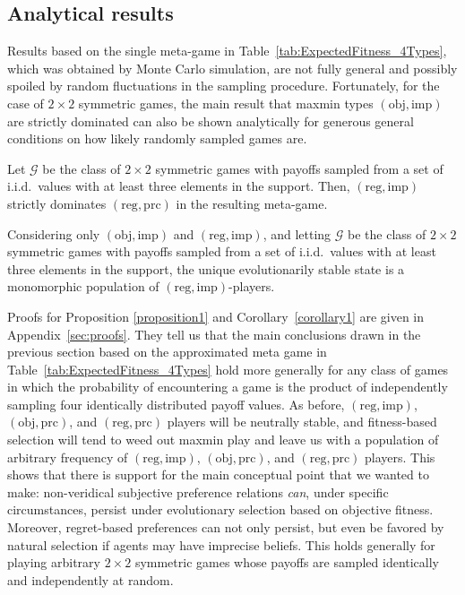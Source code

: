 \documentclass[fleqn,reqno,11pt]{article}
\begin{document}
\subsection{Analytical results}
\label{sec:analytical-results}

Results based on the single meta-game in Table~\ref{tab:ExpectedFitness_4Types}, which was
obtained by Monte Carlo simulation, are not fully general and possibly spoiled by random
fluctuations in the sampling procedure. Fortunately, for the case of $2 \times 2$ symmetric
games, the main result that maxmin types $(\text{obj}, \text{imp})$ are strictly dominated can
also be shown analytically for generous general conditions on how likely randomly sampled games
are. 

\begin{proposition} \label{proposition1}
  Let $\mathcal{G}$ be the class of $2 \times 2$ symmetric games with payoffs sampled from a
  set of i.i.d.~values with at least three elements in the support. Then,
  $(\text{reg}, \text{imp})$ strictly dominates $(\text{reg}, \text{prc})$ in the resulting
  meta-game.
\end{proposition}

\begin{corollary} \label{corollary1} Considering only $(\text{obj}, \text{imp})$ and
  $(\text{reg}, \text{imp})$, and letting $\mathcal{G}$ be the class of $2 \times 2$ symmetric
  games with payoffs sampled from a set of i.i.d.~values with at least three elements in the
  support, the unique evolutionarily stable state is a monomorphic population of
  $(\text{reg}, \text{imp})$-players.
\end{corollary}

Proofs for Proposition \ref{proposition1} and Corollary~\ref{corollary1} are given in
Appendix~\ref{sec:proofs}. They tell us that the main conclusions drawn in the previous section
based on the approximated meta game in Table~\ref{tab:ExpectedFitness_4Types} hold more
generally for any class of games in which the probability of encountering a game is the product
of independently sampling four identically distributed payoff values. As before,
$(\text{reg}, \text{imp})$, $(\text{obj}, \text{prc})$, and $(\text{reg}, \text{prc})$ players
will be neutrally stable, and fitness-based selection will tend to weed out maxmin play and
leave us with a population of arbitrary frequency of $(\text{reg}, \text{imp})$,
$(\text{obj}, \text{prc})$, and $(\text{reg}, \text{prc})$ players. This shows that there is
support for the main conceptual point that we wanted to make: non-veridical subjective
preference relations \emph{can}, under specific circumstances, persist under evolutionary
selection based on objective fitness. Moreover, regret-based preferences can not only persist,
but even be favored by natural selection if agents may have imprecise beliefs. This holds
generally for playing arbitrary $2 \times 2$ symmetric games whose payoffs are sampled
identically and independently at random.
\end{document}

